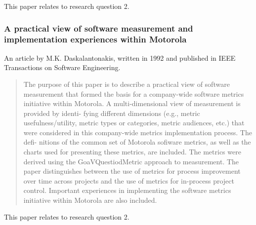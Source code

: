 \documentclass{article}
\begin{document}
This paper relates to research question 2.

\subsubsection{A practical view of software measurement and
  implementation experiences within Motorola}

An article by M.K. Daskalantonakis, written in 1992 and published in
IEEE Transactions on Software Engineering.

\begin{abstract}
 The purpose of this paper is to describe a practical view of
 software measurement that formed the basis for a company-wide
 software metrics initiative within Motorola. A multi-dimensional
 view of measurement is provided by identi- fying different
 dimensions (e.g., metric usefulness/utility, metric types or
 categories, metric audiences, etc.) that were considered in this
 company-wide metrics implementation process. The defi- nitions of
 the common set of Motorola sofiware metrics, as well as the charts
 used for presenting these metrics, are included. The metrics were
 derived using the GoaVQuestiodMetric approach to measurement. The
 paper distinguishes between the use of metrics for process
 improvement over time across projects and the use of metrics for
 in-process project control. Important experiences in implementing
 the software metrics initiative within Motorola are also included.
\end{abstract}

This paper relates to research question 2.

 

\end{document}
